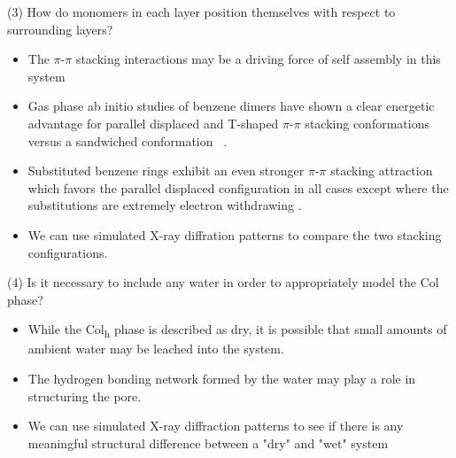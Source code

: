 \documentclass{article}
\begin{document}
   (3) How do monomers in each layer position themselves with respect to surrounding 
   layers?
   \begin{itemize}
      \item The $\pi$-$\pi$ stacking interactions may be a driving force of self assembly 
      in this system\cite{gazit_possible_2002} %
      \item Gas phase ab initio studies of benzene dimers have shown a clear energetic
      advantage for parallel displaced and T-shaped $\pi$-$\pi$ stacking conformations versus a
      sandwiched conformation ~\cite{sinnokrot_estimates_2002}.
      \item Substituted benzene rings exhibit an even stronger $\pi$-$\pi$ stacking 
      attraction which favors the parallel displaced configuration in all cases
      except where the substitutions are extremely electron withdrawing
      \cite{waller_hybrid_2006,ringer_effect_2006}.
      \item We can use simulated X-ray diffration patterns to compare the two 
      stacking configurations. 
   \end{itemize}

   (4) Is it necessary to include any water in order to appropriately model the 
   Col phase?
   \begin{itemize}
	\item While the Col\textsubscript{h} phase is described as dry, it is 
	possible that small amounts of ambient water may be leached into the system.
	\item The hydrogen bonding network formed by the water may play a role 
        in structuring the pore.
	\item We can use simulated X-ray diffraction patterns to see if there is
        any meaningful structural difference between a "dry" and "wet" system
   \end{itemize}
    
 
\end{document}
